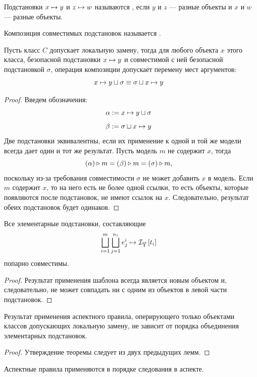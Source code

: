 \begin{Def}
Подстановки $x \mapsto y$ и $z \mapsto w$ называются , если $y$ и $z$ --- разные объекты и $x$ и $w$ --- разные объекты.

Композиция совместимых подстановок называется .
\end{Def}

\begin{Lemm}
Пусть класс $C$ допускает локальную замену, тогда для любого объекта $x$ этого класса, безопасной подстановки $x \mapsto y$ и совместимой с ней безопасной подстановкой $\sigma$, операция композиции допускает перемену мест аргументов:
$$
	x \mapsto y \sqcup \sigma \equiv \sigma \sqcup x \mapsto y 
$$
\end{Lemm}
\begin{proof}
Введем обозначения:
$$\alpha := x \mapsto y \sqcup \sigma$$
$$\beta := \sigma \sqcup x \mapsto y$$
Две подстановки эквивалентны, если их применение к одной и той же модели всегда дает один и тот же результат. Пусть модель $m$ не содержит $x$, тогда
$$\left( \alpha \right) \triangleright m = \left( \beta \right) \triangleright m = \left( \sigma \right) \triangleright m,$$
поскольку из-за требования совместимости $\sigma$ не может добавить $x$ в модель.
Если $m$ содержит $x$, то на него есть не более одной ссылки, то есть объекты, которые появляются после подстановок, не имеют ссылок на $x$. Следовательно, результат обеих подстановок будет одинаков.
\end{proof}

\begin{Lemm}
Все элементарные подстановки, составляющие 
$$
\bigsqcup\limits_{i=1}^{m} \bigsqcup\limits_{j=1}^{n_i}
			e^i_j \mapsto \mathcal{I}_{\overline{\Upsilon}} \left[ t_i \right]
$$
попарно совместимы.
\end{Lemm}
\begin{proof}
Результат применения шаблона всегда является новым объектом и, следовательно, не может совпадать ни с одним из объектов в левой части подстановок.
\end{proof}

\begin{Th}
Результат применения аспектного правила, оперирующего только объектами классов допускающих локальную замену, не зависит от порядка объединения элементарных подстановок.
\end{Th}
\begin{proof}
Утверждение теоремы следует из двух предыдущих лемм.
\end{proof}

Аспектные правила применяются в порядке следования в аспекте.

